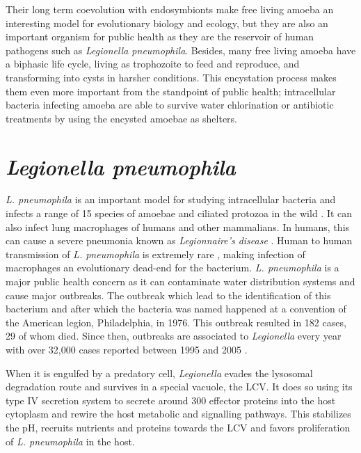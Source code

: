 Their long term coevolution with endosymbionts make free living amoeba an interesting model for evolutionary biology and ecology, but they are also an important organism for public health as they are the reservoir of human pathogens such as \textit{Legionella pneumophila}. Besides, many free living amoeba have a biphasic life cycle, living as trophozoite to feed and reproduce, and transforming into cysts in harsher conditions. This encystation process makes them even more important from the standpoint of public health; intracellular bacteria infecting amoeba are able to survive water chlorination or antibiotic treatments by using the encysted amoebae as shelters.

\section{\textit{Legionella pneumophila}}

\textit{L. pneumophila} is an important model for studying intracellular bacteria and infects a range of 15 species of amoebae and ciliated protozoa in the wild \cite{Rowbotham1980}. It can also infect lung macrophages of humans and other mammalians. In humans, this can cause a severe pneumonia known as \textit{Legionnaire's disease} \cite{Edelstein2014}. Human to human transmission of \textit{L. pneumophila} is extremely rare \cite{Correia2016}, making infection of macrophages an evolutionary dead-end for the bacterium. \textit{L. pneumophila} is a major public health concern as it can contaminate water distribution systems and cause major outbreaks. The outbreak which lead to the identification of this bacterium and after which the bacteria was named happened at a convention of the American legion, Philadelphia, in 1976. This outbreak resulted in 182 cases, 29 of whom died. Since then, outbreaks are associated to \textit{Legionella} every year with over 32,000 cases reported between 1995 and 2005 \cite{mcdade2008}.

When it is engulfed by a predatory cell, \textit{Legionella} evades the lysosomal degradation route and survives in a special vacuole, the \acrfull{LCV}. It does so using its type IV secretion system to secrete around 300 effector proteins into the host cytoplasm and rewire the host metabolic and signalling pathways. This stabilizes the pH, recruits nutrients and proteins towards the \acrshort{LCV} and favors proliferation of \textit{L. pneumophila} in the host.


